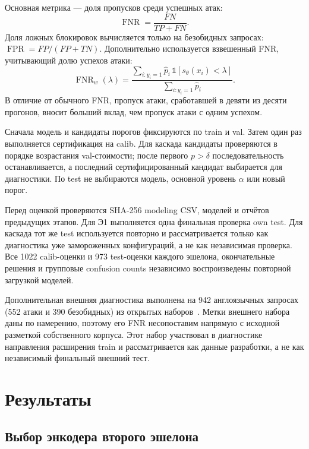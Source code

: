 \documentclass{misisarticle}
\begin{document}
Основная метрика --- доля пропусков среди успешных атак:
\begin{equation}
  \operatorname{FNR}=\frac{FN}{TP+FN}.
  \label{eq:fnr}
\end{equation}
Доля ложных блокировок вычисляется только на безобидных запросах: $\operatorname{FPR}=FP/(FP+TN)$. Дополнительно используется взвешенный FNR, учитывающий долю успехов атаки:
\begin{equation}
  \operatorname{FNR}_{w}(\lambda)=
  \frac{\sum_{i:y_i=1}\hat p_i\,\mathbb{1}[s_\theta(x_i)<\lambda]}
       {\sum_{i:y_i=1}\hat p_i}.
  \label{eq:wfnr}
\end{equation}
В отличие от обычного FNR, пропуск атаки, сработавшей в девяти из десяти прогонов, вносит больший вклад, чем пропуск атаки с одним успехом.

Сначала модель и кандидаты порогов фиксируются по train и val. Затем один раз выполняется сертификация на calib. Для каскада кандидаты проверяются в порядке возрастания val-стоимости; после первого $p>\delta$ последовательность останавливается, а последний сертифицированный кандидат выбирается для диагностики. По test не выбираются модель, основной уровень $\alpha$ или новый порог.

Перед оценкой проверяются SHA-256 modeling CSV, моделей и отчётов предыдущих этапов. Для Э1 выполняется одна финальная проверка own test. Для каскада тот же test используется повторно и рассматривается только как диагностика уже замороженных конфигураций, а не как независимая проверка. Все 1022 calib-оценки и 973 test-оценки каждого эшелона, окончательные решения и групповые confusion counts независимо воспроизведены повторной загрузкой моделей.

Дополнительная внешняя диагностика выполнена на 942 англоязычных запросах (552 атаки и 390 безобидных) из открытых наборов~\cite{neuralchemy, dolly15k}. Метки внешнего набора даны по намерению, поэтому его FNR несопоставим напрямую с исходной разметкой собственного корпуса. Этот набор участвовал в диагностике направления расширения train и рассматривается как данные разработки, а не как независимый финальный внешний тест.

\section{Результаты}

\subsection{Выбор энкодера второго эшелона}
\end{document}

